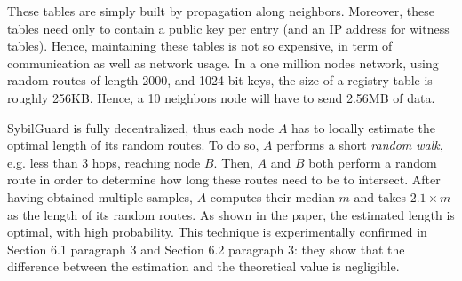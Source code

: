 \documentclass[a4paper,11pt]{article}
\begin{document}
These tables are simply built by propagation along neighbors.
Moreover, these tables need only to contain a public key per entry (and an IP address for witness tables). Hence,
maintaining these tables is not so expensive, in term of communication
as well as network usage. In a one million
nodes network, using random routes of length 2000, and 1024-bit
keys, the size of a registry table is roughly 256KB.  Hence, a 10 neighbors node will have to send 2.56MB of data.


SybilGuard is fully decentralized, thus each node $A$ has to locally
estimate the optimal length of its random routes.  To do so, $A$
performs a short \emph{random walk}, e.g. less than 3 hops, reaching
node $B$. Then, $A$ and $B$ both perform a random route in order to
determine how long these routes need to be to intersect.  After having
obtained multiple samples, $A$ computes their median $m$ and takes
$2.1 \times m$ as the length of its random routes. As shown in the
paper, the estimated length is optimal, with high probability. This
technique is experimentally confirmed in Section 6.1 paragraph 3 and
Section 6.2 paragraph 3: they show that the difference between the
estimation and the theoretical value is negligible.

\end{document}

